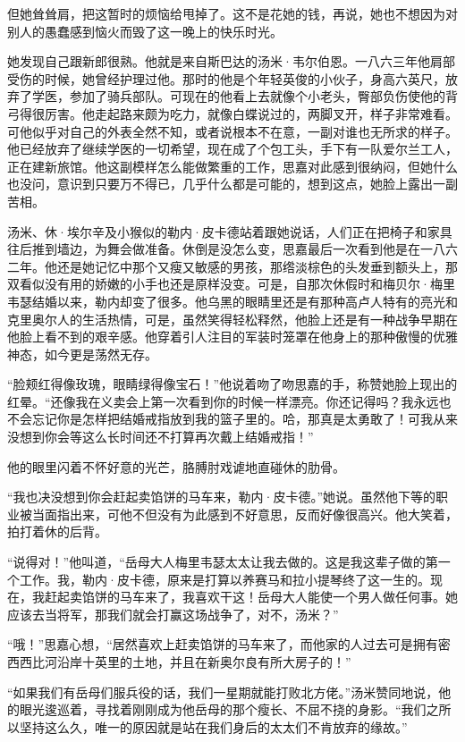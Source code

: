 \par 但她耸耸肩，把这暂时的烦恼给甩掉了。这不是花她的钱，再说，她也不想因为对别人的愚蠢感到恼火而毁了这一晚上的快乐时光。
\par 她发现自己跟新郎很熟。他就是来自斯巴达的汤米·韦尔伯恩。一八六三年他肩部受伤的时候，她曾经护理过他。那时的他是个年轻英俊的小伙子，身高六英尺，放弃了学医，参加了骑兵部队。可现在的他看上去就像个小老头，臀部负伤使他的背弓得很厉害。他走起路来颇为吃力，就像白蝶说过的，两脚叉开，样子非常难看。可他似乎对自己的外表全然不知，或者说根本不在意，一副对谁也无所求的样子。他已经放弃了继续学医的一切希望，现在成了个包工头，手下有一队爱尔兰工人，正在建新旅馆。他这副模样怎么能做繁重的工作，思嘉对此感到很纳闷，但她什么也没问，意识到只要万不得已，几乎什么都是可能的，想到这点，她脸上露出一副苦相。
\par 汤米、休·埃尔辛及小猴似的勒内·皮卡德站着跟她说话，人们正在把椅子和家具往后推到墙边，为舞会做准备。休倒是没怎么变，思嘉最后一次看到他是在一八六二年。他还是她记忆中那个又瘦又敏感的男孩，那绺淡棕色的头发垂到额头上，那双看似没有用的娇嫩的小手也还是原样没变。可是，自那次休假时和梅贝尔·梅里韦瑟结婚以来，勒内却变了很多。他乌黑的眼睛里还是有那种高卢人特有的亮光和克里奥尔人的生活热情，可是，虽然笑得轻松释然，他脸上还是有一种战争早期在他脸上看不到的艰辛感。他穿着引人注目的军装时笼罩在他身上的那种傲慢的优雅神态，如今更是荡然无存。
\par “脸颊红得像玫瑰，眼睛绿得像宝石！”他说着吻了吻思嘉的手，称赞她脸上现出的红晕。“还像我在义卖会上第一次看到你的时候一样漂亮。你还记得吗？我永远也不会忘记你是怎样把结婚戒指放到我的篮子里的。哈，那真是太勇敢了！可我从来没想到你会等这么长时间还不打算再次戴上结婚戒指！”
\par 他的眼里闪着不怀好意的光芒，胳膊肘戏谑地直碰休的肋骨。
\par “我也决没想到你会赶起卖馅饼的马车来，勒内·皮卡德。”她说。虽然他下等的职业被当面指出来，可他不但没有为此感到不好意思，反而好像很高兴。他大笑着，拍打着休的后背。
\par “说得对！”他叫道，“岳母大人梅里韦瑟太太让我去做的。这是我这辈子做的第一个工作。我，勒内·皮卡德，原来是打算以养赛马和拉小提琴终了这一生的。现在，我赶起卖馅饼的马车来了，我喜欢干这！岳母大人能使一个男人做任何事。她应该去当将军，那我们就会打赢这场战争了，对不，汤米？”
\par “哦！”思嘉心想，“居然喜欢上赶卖馅饼的马车来了，而他家的人过去可是拥有密西西比河沿岸十英里的土地，并且在新奥尔良有所大房子的！”
\par “如果我们有岳母们服兵役的话，我们一星期就能打败北方佬。”汤米赞同地说，他的眼光逡巡着，寻找着刚刚成为他岳母的那个瘦长、不屈不挠的身影。“我们之所以坚持这么久，唯一的原因就是站在我们身后的太太们不肯放弃的缘故。”
